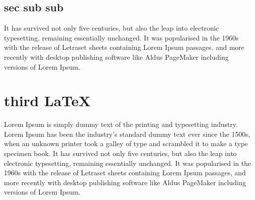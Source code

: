 \documentclass[11pt, a4paper]{article}
\begin{document}
\subsection{sec sub sub}

 It has survived not only five centuries, but also the leap into electronic typesetting, remaining essentially unchanged. It was popularised in the 1960s with the release of Letraset sheets containing Lorem Ipsum passages, and more recently with desktop publishing software like Aldus PageMaker including versions of Lorem Ipsum.
 
 
\section{third \LaTeX{}}


Lorem Ipsum is simply dummy text of the printing and typesetting industry. Lorem Ipsum has been the industry's standard dummy text ever since the 1500s, when an unknown printer took a galley of type and scrambled it to make a type specimen book. It has survived not only five centuries, but also the leap into electronic typesetting, remaining essentially unchanged. It was popularised in the 1960s with the release of Letraset sheets containing Lorem Ipsum passages, and more recently with desktop publishing software like Aldus PageMaker including versions of Lorem Ipsum.
\end{document}

